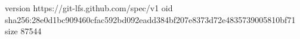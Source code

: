 version https://git-lfs.github.com/spec/v1
oid sha256:28e0d1bc909460cfac592bd092eadd384bf207e8373d72e4835739005810bf71
size 87544

